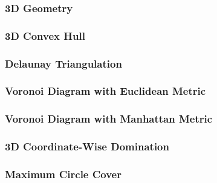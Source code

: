 \subsubsection{3D Geometry}
\subsubsection{3D Convex Hull}
\subsubsection{Delaunay Triangulation}
\subsubsection{Voronoi Diagram with Euclidean Metric}
\subsubsection{Voronoi Diagram with Manhattan Metric}
\subsubsection{3D Coordinate-Wise Domination}
\subsubsection{Maximum Circle Cover}